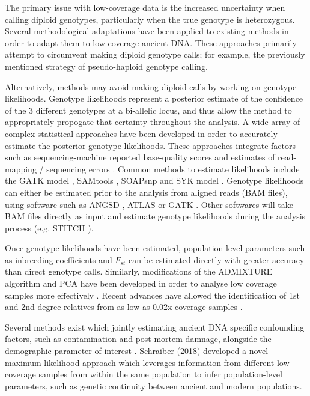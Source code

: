 The primary issue with low-coverage data is the increased uncertainty when calling diploid genotypes, particularly when the true genotype is heterozygous. Several methodological adaptations have been applied to existing methods in order to adapt them to low coverage ancient DNA. These approaches primarily attempt to circumvent making diploid genotype calls; for example, the previously mentioned strategy of pseudo-haploid genotype calling.

Alternatively, methods may avoid making diploid calls by working on genotype likelihoods. Genotype likelihoods represent a posterior estimate of the confidence of the 3 different genotypes at a bi-allelic locus, and thus allow the method to appropriately propogate that certainty throughout the analysis. A wide array of complex statistical approaches have been developed in order to accurately estimate the posterior genotype likelihoods. These approaches integrate factors such as sequencing-machine reported base-quality scores and estimates of read-mapping / sequencing errors \cite{McKenna2010}. Common methods to estimate likelihoods include the GATK model \cite{VanderAuwera2013}, SAMtools \cite{Li2009}, SOAPsnp \cite{Li2009a} and SYK model \cite{Kim2011}. Genotype likelihoods can either be estimated prior to the analysis from aligned reads (BAM files), using software such as ANGSD \cite{Korneliussen2014}, ATLAS \cite{Link2017} or GATK \cite{VanderAuwera2013}. Other softwares will take BAM files directly as input and estimate genotype likelihoods during the analysis process (e.g. STITCH \cite{Davies2016}). 

Once genotype likelihoods have been estimated, population level parameters such as inbreeding coefficients and $F_{st}$ can be estimated directly \cite{Korneliussen2014} with greater accuracy than direct genotype calls. Similarly, modifications of the ADMIXTURE \cite{Alexander2009} algorithm and PCA have been developed in order to analyse low coverage samples more effectively \cite{skotte2013estimating, zhang2021novel}. Recent advances have allowed the identification of 1st and 2nd-degree relatives from as low as 0.02x coverage samples \cite{fernandes2017identification, fernandes2021tkgwv2}. 

Several methods exist which jointly estimating ancient DNA specific confounding factors, such as contamination and  post-mortem damnage, alongside the demographic parameter of interest \cite{Racimo2016}. Schraiber (2018) \cite{Schraiber2018} developed a novel maximum-likelihood approach which leverages information from different low-coverage samples from within the same population to infer population-level parameters, such as genetic continuity between ancient and modern populations.  
 
